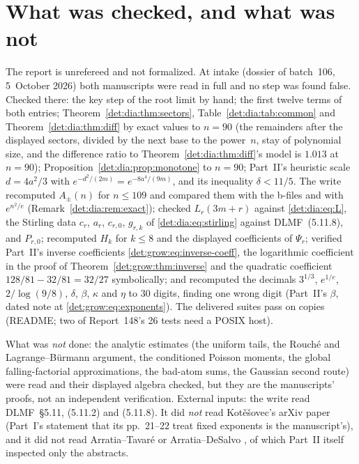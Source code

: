 \documentclass[11pt,letterpaper]{article}
\numberwithin{equation}{section}
\theoremstyle{definition}\newtheorem{definition}[theorem]{Definition}
\theoremstyle{remark}\newtheorem{remark}[theorem]{Remark}
\begin{document}
\section*{What was checked, and what was not}\label{det:sec:trust}
The report is unrefereed and not formalized. At intake (dossier of batch~106, 5~October 2026) both manuscripts were read in full and no step was found false. Checked there: the key step of the root limit by hand; the first twelve terms of both entries; Theorem~\ref{det:dia:thm:sectors}, Table~\ref{det:dia:tab:common} and Theorem~\ref{det:dia:thm:diff} by exact values to $n=90$ (the remainders after the displayed sectors, divided by the next base to the power~$n$, stay of polynomial size, and the difference ratio to Theorem~\ref{det:dia:thm:diff}'s model is $1.013$ at $n=90$); Proposition~\ref{det:dia:prop:monotone} to $n=90$; Part~II's heuristic scale $d=4a^2/3$ with $e^{-d^2/(2m)}=e^{-8a^4/(9m)}$, and its inequality $\delta<11/5$. The write recomputed $A_\pm(n)$ for $n\le109$ and compared them with the b-files and with $e^{n^2/e}$ (Remark~\ref{det:dia:rem:exact}); checked $L_r(3m+r)$ against \eqref{det:dia:eq:L}, the Stirling data $c_r$, $a_r$, $c_{r,0}$, $g_{r,k}$ of \eqref{det:dia:eq:stirling} against DLMF~(5.11.8), and $P_{r,0}$; recomputed $H_k$ for $k\le8$ and the displayed coefficients of $\Psi_r$; verified Part~II's inverse coefficients \eqref{det:grow:eq:inverse-coeff}, the logarithmic coefficient in the proof of Theorem~\ref{det:grow:thm:inverse} and the quadratic coefficient $128/81-32/81=32/27$ symbolically; and recomputed the decimals $3^{1/3}$, $e^{1/e}$, $2/\log(9/8)$, $\delta$, $\beta$, $\kappa$ and $\eta$ to 30 digits, finding one wrong digit (Part~II's $\beta$, dated note at \eqref{det:grow:eq:exponents}). The delivered suites pass on copies (README; two of Report~148's 26 tests need a POSIX host).

What was \emph{not} done: the analytic estimates (the uniform tails, the Rouch\'e and Lagrange--B\"urmann argument, the conditioned Poisson moments, the global falling-factorial approximations, the bad-atom sums, the Gaussian second route) were read and their displayed algebra checked, but they are the manuscripts' proofs, not an independent verification. External inputs: the write read DLMF~\S5.11, (5.11.2) and (5.11.8). It did \emph{not} read Kot\v{e}\v{s}ovec's arXiv paper \cite{kotesovec} (Part~I's statement that its pp.~21--22 treat fixed exponents is the manuscript's), and it did not read Arratia--Tavar\'e \cite{arratia-tavare} or Arratia--DeSalvo \cite{arratia-desalvo}, of which Part~II itself inspected only the abstracts.
\end{document}
